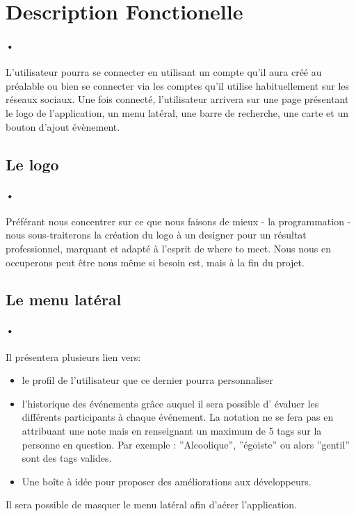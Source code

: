 \documentclass[pdftex,12pt,a4paper]{article}
\begin{document}
\section{Description Fonctionelle}
\paragraph{•}
L’utilisateur pourra se connecter en utilisant un compte qu'il aura cr\'e\'e au pr\'ealable ou bien se connecter via les comptes qu'il utilise habituellement sur les réseaux sociaux.
Une fois connect\'e, l’utilisateur arrivera sur une page pr\'esentant le logo de l’application, un menu lat\'eral, une barre de recherche, une carte et un bouton d’ajout \'ev\`enement.

\subsection{Le logo}
\paragraph{•}
Pr\'ef\'erant nous concentrer sur ce que nous faisons de mieux - la programmation - nous sous-traiterons la cr\'eation du logo à un designer pour un résultat professionnel, marquant et adapt\'e à l’esprit de where to meet. Nous nous en occuperons peut \^etre nous m\^eme si besoin est, mais à la fin du projet. 
\newpage
\subsection{Le menu lat\'eral}
\paragraph{•}
Il pr\'esentera plusieurs lien vers:
\begin{itemize}
 \item le profil de l'utilisateur que ce dernier pourra personnaliser
\item l'historique des \'ev\'enements gr\^ace auquel il sera possible d' \'evaluer les diff\'erents participants \`a chaque \'ev\'enement. La notation ne se fera pas en attribuant une note mais en renseignant un maximum de 5 tags sur la personne en question. Par exemple : ''Alcoolique'', ''\'egoiste'' ou alors ''gentil'' sont des tags valides. 
\item Une bo\^ite \`a id\'ee pour proposer des am\'eliorations aux développeurs.
\end{itemize}
Il sera possible de masquer le menu latéral afin d'a\'erer l’application. 
\end{document}
